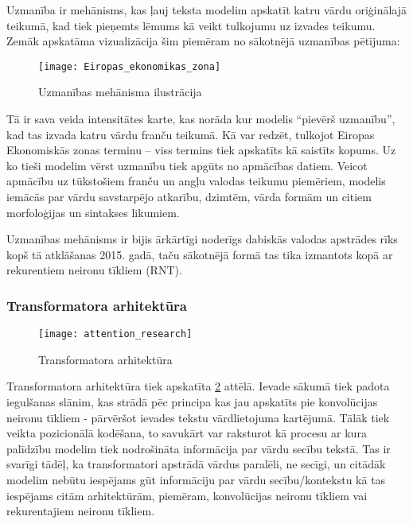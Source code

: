 Uzmanība ir mehānisms, kas ļauj teksta modelim apskatīt katru vārdu oriģinālajā teikumā, kad tiek pieņemts lēmums kā veikt tulkojumu uz izvades teikumu. Zemāk apskatāma vizualizācija šim piemēram no sākotnējā uzmanības pētījuma:

\begin{figure}[H]
\texttt{[image: Eiropas\_ekonomikas\_zona]}
\caption{Uzmanības mehānisma ilustrācija \cite{bahdanau2016neural}}
\label{fig:Eiropas_ekonomikas_zona}
\end{figure}

Tā ir sava veida intensitātes karte, kas norāda kur modelis “pievērš uzmanību”, kad tas izvada katru vārdu franču teikumā. Kā var redzēt, tulkojot Eiropas Ekonomiskās zonas terminu – viss termins tiek apskatīts kā saistīts kopums. Uz ko tieši modelim vērst uzmanību tiek apgūts no apmācības datiem. Veicot apmācību uz tūkstošiem franču un angļu valodas teikumu piemēriem, modelis iemācās par vārdu savstarpējo atkarību, dzimtēm, vārda formām un citiem morfoloģijas un sintakses likumiem. 

Uzmanības mehānisms ir bijis ārkārtīgi noderīgs dabiskās valodas apstrādes rīks kopš tā atklāšanas 2015. gadā, taču sākotnējā formā tas tika izmantots kopā ar rekurentiem neironu tīkliem (RNT). 

\subsubsection{Transformatora arhitektūra}

\begin{figure}[H]
	\texttt{[image: attention\_research]}
	\caption{Transformatora arhitektūra \cite{vaswani2023attention} }
	\label{fig:vaswani2023attention_img}
\end{figure}

Transformatora arhitektūra tiek apskatīta \ref{fig:vaswani2023attention_img} attēlā. Ievade sākumā tiek padota iegulšanas slānim, kas strādā pēc principa kas jau apskatīts pie konvolūcijas neironu tīkliem - pārvēršot ievades tekstu vārdlietojuma kartējumā. Tālāk tiek veikta pozicionālā kodēšana, to savukārt var raksturot kā procesu ar kura palīdzību modelim tiek nodrošināta informācija par vārdu secību tekstā. Tas ir svarīgi tādēļ, ka transformatori apstrādā vārdus paralēli, ne secīgi, un citādāk modelim nebūtu iespējams gūt informāciju par vārdu secību/kontekstu kā tas iespējams citām arhitektūrām, piemēram, konvolūcijas neironu tīkliem vai rekurentajiem neironu tīkliem.

